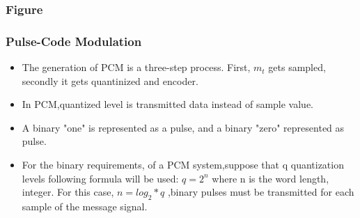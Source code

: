 \documentclass{beamer}
\begin{document}
         \begin{frame}
         \frametitle{Figure}
         \end{frame}
         
         \begin{frame}
         \frametitle{Pulse-Code Modulation}
         \begin{itemize}
         \item The generation of PCM is a three-step process. First, $m_t$ gets sampled, secondly it gets quantinized and encoder.
         \item In PCM,quantized level is transmitted data instead of sample value.
         \item A binary "one" is represented as a pulse, and a binary "zero" represented as pulse.
         \item For the binary requirements, of a PCM system,suppose that q 	quantization levels following formula  will be used: $q=2^n$ where n is the word length, integer. For this case, $n=log_2*q$ ,binary pulses must be transmitted for each sample of the message signal.
         \end {itemize}
         \end{frame}
         
\end{document}
